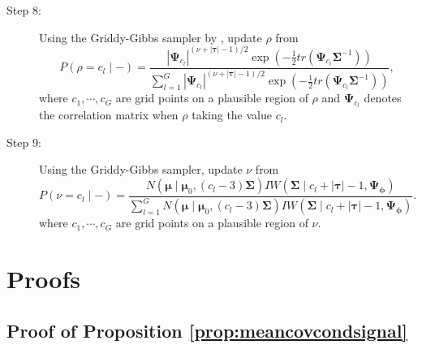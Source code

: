 \begin{description}
   \item [Step 8:] Using the Griddy-Gibbs sampler by \citet{Ritter1992}, update $\rho$ from 
   \begin{equation*}
   	P(\rho=c_l\mid -)=\frac{|\boldsymbol{\Psi}_{c_l}|^{(\nu+|\boldsymbol{\tau}|-1)/2}\exp(-\frac{1}{2}tr(\boldsymbol{\Psi}_{c_l}\boldsymbol{\Sigma}^{-1}))}{\sum_{l=1}^G|\boldsymbol{\Psi}_{c_l}|^{(\nu+|\boldsymbol{\tau}|-1)/2}\exp(-\frac{1}{2}tr(\boldsymbol{\Psi}_{c_l}\boldsymbol{\Sigma}^{-1}))},
   \end{equation*}
   where $c_1,\cdots,c_G$ are grid points on a plausible region of $\rho$ and $\boldsymbol{\Psi}_{c_l}$ denotes the correlation matrix when $\rho$ taking the value $c_l$.
   
   \item [Step 9:] Using the Griddy-Gibbs sampler, update $\nu$ from
   \begin{equation*}
   	P(\nu=c_l\mid -)=\frac{N(\boldsymbol{\mu}\mid\boldsymbol{\mu}_0,(c_l-3)\boldsymbol{\Sigma})IW(\boldsymbol{\Sigma}\mid c_l+|\boldsymbol{\tau}|-1,\boldsymbol{\Psi}_{\boldsymbol{\phi}})}{\sum_{l=1}^GN(\boldsymbol{\mu}\mid\boldsymbol{\mu}_0,(c_l-3)\boldsymbol{\Sigma})IW(\boldsymbol{\Sigma}\mid c_l+|\boldsymbol{\tau}|-1,\boldsymbol{\Psi}_{\boldsymbol{\phi}})}.
   \end{equation*}
 where $c_1,\cdots,c_G$ are grid points on a plausible region of $\nu$.
 
 \end{description}

\section{Proofs}

\subsection*{Proof of Proposition \ref{prop:meancovcondsignal}}
\label{subsec:proofmeancovcond}


